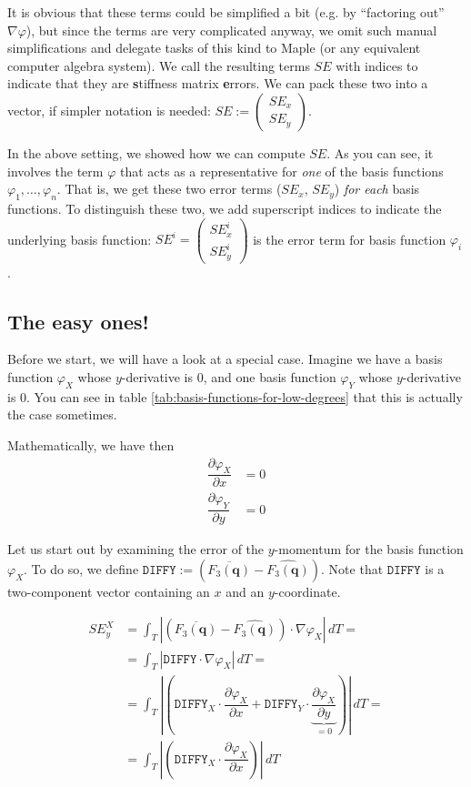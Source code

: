 \documentclass{article}
\newcommand{\pd}[2]{\dfrac{\partial #1}{\partial #2}}
\renewcommand{\phi}{\varphi}
\begin{document}
It is obvious that these terms could be simplified a bit (e.g. by ``factoring out'' $\nabla \phi$), but since the terms are very complicated anyway, we omit such manual simplifications and delegate tasks of this kind to Maple (or any equivalent computer algebra system). We call the resulting terms $SE$ with indices to indicate that they are \textbf{s}tiffness matrix \textbf{e}rrors. We can pack these two into a vector, if simpler notation is needed: $SE :=
\begin{pmatrix}
  SE_x \\ SE_y
\end{pmatrix}$.

In the above setting, we showed how we can compute $SE$. As you can see, it involves the term $\phi$ that acts as a representative for \emph{one} of the basis functions $\phi_1,\dots,\phi_n$. That is, we get these two error terms ($SE_x$, $SE_y$) \emph{for each} basis functions. To distinguish these two, we add superscript indices to indicate the underlying basis function: $SE^i=
\begin{pmatrix}
  SE_x^i \\ SE_y^i
\end{pmatrix}$ is the error term for basis function $\phi_i$.

\subsection{The easy ones!}
\label{sec:stiffness-analysis-easy-ones}

Before we start, we will have a look at a special case. Imagine we have a basis function $\phi_X$ whose $y$-derivative is 0, and one basis function $\phi_Y$ whose $y$-derivative is 0. You can see in table \ref{tab:basis-functions-for-low-degrees} that this is actually the case sometimes.

Mathematically, we have then
\begin{align*}
  \pd{\phi_X}{x} &= 0 \\
  \pd{\phi_Y}{y} &= 0 
\end{align*}

Let us start out by examining the error of the $y$-momentum for the basis function $\phi_X$. To do so, we define $\mathtt{DIFFY}:=\left( \overline{F_3(\mathbf{q})} - \widehat{F_3(\mathbf{q})} \right)$. Note that $\mathtt{DIFFY}$ is a two-component vector containing an $x$ and an $y$-coordinate.

\begin{align*}
  SE_y^X &= \int_T \left| \left( \overline{F_3(\mathbf{q})} - \widehat{F_3(\mathbf{q})} \right) \cdot \nabla \phi_X \right| \, dT = \\
  &= \int_T \left| \mathtt{DIFFY} \cdot \nabla \phi_X \right|\,dT = \\
  &= \int_T \left| \left( \mathtt{DIFFY}_X \cdot \pd{\phi_X}{x} + \mathtt{DIFFY}_Y \cdot \underbrace{\pd{\phi_X}{y}}_{=0} \right) \right| \, dT = \\
  &=\int_T \left| \left( \mathtt{DIFFY}_X \cdot \pd{\phi_X}{x} \right) \right| \, dT
\end{align*}
\end{document}
